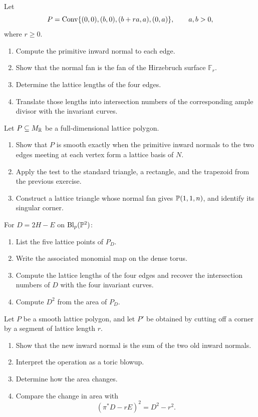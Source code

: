 \begin{exercises}
\item Let
\[
P=\Conv\{(0,0),(b,0),(b+ra,a),(0,a)\},
\qquad
a,b>0,
\]
where \(r\geq0\).
\begin{enumerate}[label=(\alph*),wide=0pt]
\item Compute the primitive inward normal to each edge.
\item Show that the normal fan is the fan of the Hirzebruch surface
\(\mathbb F_r\).
\item Determine the lattice lengths of the four edges.
\item Translate those lengths into intersection numbers of the
corresponding ample divisor with the invariant curves.
\end{enumerate}

\item Let \(P\subseteq M_\RR\) be a full-dimensional lattice polygon.
\begin{enumerate}[label=(\alph*),wide=0pt]
\item Show that \(P\) is smooth exactly when the primitive inward
normals to the two edges meeting at each vertex form a lattice basis of
\(N\).
\item Apply the test to the standard triangle, a rectangle, and the
trapezoid from the previous exercise.
\item Construct a lattice triangle whose normal fan gives
\(\PP(1,1,n)\), and identify its singular corner.
\end{enumerate}

\item For \(D=2H-E\) on \(\Blp{\PP^2}{p}\):
\begin{enumerate}[label=(\alph*),wide=0pt]
\item List the five lattice points of \(P_D\).
\item Write the associated monomial map on the dense torus.
\item Compute the lattice lengths of the four edges and recover the
intersection numbers of \(D\) with the four invariant curves.
\item Compute \(D^2\) from the area of \(P_D\).
\end{enumerate}

\item Let \(P\) be a smooth lattice polygon, and let \(P'\) be obtained
by cutting off a corner by a segment of lattice length \(r\).
\begin{enumerate}[label=(\alph*),wide=0pt]
\item Show that the new inward normal is the sum of the two old inward
normals.
\item Interpret the operation as a toric blowup.
\item Determine how the area changes.
\item Compare the change in area with
\[
(\pi^*D-rE)^2=D^2-r^2.
\]
\end{enumerate}


\end{exercises}

